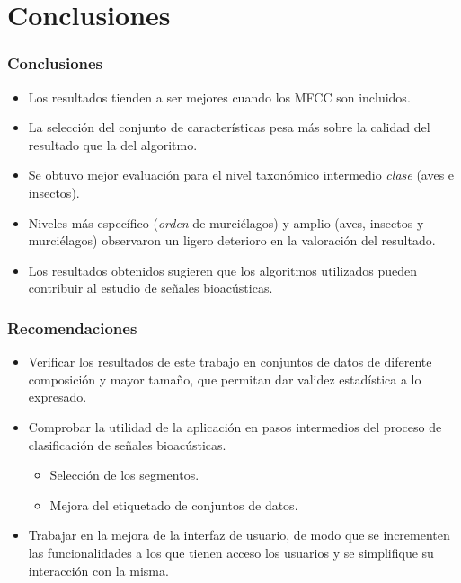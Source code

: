 \section*{Conclusiones}\label{sec:conclusion}

\begin{frame}
    \frametitle{Conclusiones}

    \begin{itemize}
        \item<2-> Los resultados tienden a ser mejores cuando los MFCC son incluidos.
        \item<3-> La selección del conjunto de características pesa más sobre la calidad del resultado que la del algoritmo.
        \item<4-> Se obtuvo mejor evaluación para el nivel taxonómico intermedio \textit{clase} (aves e insectos).
        \item<5-> Niveles más específico (\textit{orden} de murciélagos) y amplio (aves, insectos y murciélagos) observaron un ligero deterioro en la valoración del resultado.
    \end{itemize}

    \begin{itemize}
        \item<6-> Los resultados obtenidos sugieren que los algoritmos utilizados pueden contribuir al estudio de señales bioacústicas.
    \end{itemize}

\end{frame}

\begin{frame}
    \frametitle{Recomendaciones}

    \begin{itemize}
        \item<2-> Verificar los resultados de este trabajo en conjuntos de datos de diferente composición y mayor tamaño, que permitan dar validez estadística a lo expresado.
        \item<3-> Comprobar la utilidad de la aplicación en pasos intermedios del proceso de clasificación de señales bioacústicas.
        \begin{itemize}
            \item<4-> Selección de los segmentos.
            \item<5-> Mejora del etiquetado de conjuntos de datos.
        \end{itemize}
        \item<6-> Trabajar en la mejora de la interfaz de usuario, de modo que se incrementen las funcionalidades a los que tienen acceso los usuarios y se simplifique su interacción con la misma.
    \end{itemize}

\end{frame}